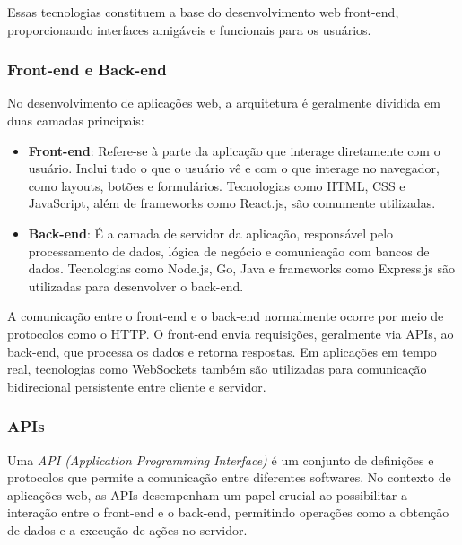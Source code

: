 Essas tecnologias constituem a base do desenvolvimento web front-end, proporcionando interfaces amigáveis e funcionais para os usuários.

\subsubsection{Front-end e Back-end}


No desenvolvimento de aplicações web, a arquitetura é geralmente dividida em duas camadas principais\cite{web-app}:

\begin{itemize}
    \item \textbf{Front-end}: Refere-se à parte da aplicação que interage diretamente com o usuário. Inclui tudo o que o usuário vê e com o que interage no navegador, como layouts, botões e formulários. Tecnologias como HTML, CSS e JavaScript, além de frameworks como React.js, são comumente utilizadas.
    \item \textbf{Back-end}: É a camada de servidor da aplicação, responsável pelo processamento de dados, lógica de negócio e comunicação com bancos de dados. Tecnologias como Node.js, Go, Java e frameworks como Express.js são utilizadas para desenvolver o back-end.
\end{itemize}

A comunicação entre o front-end e o back-end normalmente ocorre por meio de protocolos como o HTTP. O front-end envia requisições, geralmente via APIs\cite{web-app}, ao back-end, que processa os dados e retorna respostas. Em aplicações em tempo real, tecnologias como WebSockets também são utilizadas para comunicação bidirecional\cite{ws-standard} persistente entre cliente e servidor.

\subsubsection{APIs}


Uma \emph{API (Application Programming Interface)} é um conjunto de definições e protocolos que permite a comunicação entre diferentes softwares. No contexto de aplicações web, as APIs desempenham um papel crucial ao possibilitar a interação entre o front-end e o back-end, permitindo operações como a obtenção de dados e a execução de ações no servidor. \cite{aws-api-types}

